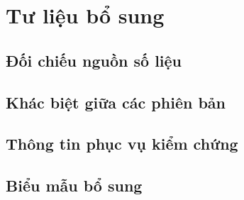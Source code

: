 \chapter{Tư liệu bổ sung}\label{chap:appendices-supplementary-results}

\par{}
\section{Đối chiếu nguồn số liệu}\label{section:supplementary-results-2}

\par{}
\section{Khác biệt giữa các phiên bản}\label{section:supplementary-results-3}

\par{}
\section{Thông tin phục vụ kiểm chứng}\label{section:supplementary-results-4}

\par{}
\section{Biểu mẫu bổ sung}\label{section:supplementary-results-5}

